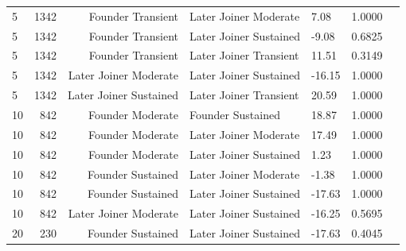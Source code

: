 \begin{table}[H]
\begin{tabular}{l r r l l r r}
5 & 1342 & Founder Transient & Later Joiner Moderate & 7.08 & 1.0000 \\ 
5 & 1342 & Founder Transient & Later Joiner Sustained & -9.08 & 0.6825 \\ 
5 & 1342 & Founder Transient & Later Joiner Transient & 11.51 & 0.3149 \\ 
5 & 1342 & Later Joiner Moderate & Later Joiner Sustained & -16.15 & 1.0000 \\ 
5 & 1342 & Later Joiner Sustained & Later Joiner Transient & 20.59 & 1.0000 \\ 
10 & 842 & Founder Moderate & Founder Sustained & 18.87 & 1.0000 \\ 
10 & 842 & Founder Moderate & Later Joiner Moderate & 17.49 & 1.0000 \\ 
10 & 842 & Founder Moderate & Later Joiner Sustained & 1.23 & 1.0000 \\ 
10 & 842 & Founder Sustained & Later Joiner Moderate & -1.38 & 1.0000 \\ 
10 & 842 & Founder Sustained & Later Joiner Sustained & -17.63 & 1.0000 \\ 
10 & 842 & Later Joiner Moderate & Later Joiner Sustained & -16.25 & 0.5695 \\ 
20 & 230 & Founder Sustained & Later Joiner Sustained & -17.63 & 0.4045 \\ 
\bottomrule
\end{tabular}%
\label{tab:codebase_graph_latex_repository_graph_component_time_series_holm_bonferroni_no_sig_five_and_tenmethods} 
\end{table}
\newpage 
